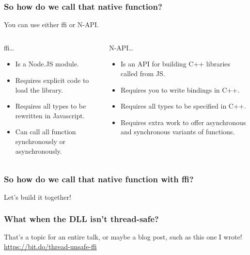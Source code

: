 \begin{frame}
	\frametitle{So how do we call that native function?}

	You can use either ffi or N-API. \vspace{1em}

	\begin{columns}[t]
		\begin{column}{0.5\textwidth}
			ffi…
			\begin{itemize}
				\item Is a Node.JS module.
				\item Requires explicit code to load the library.
				\item Requires all types to be rewritten in Javascript.
				\item Can call all function synchronously or asynchronously.
			\end{itemize}
		\end{column}
		\begin{column}{0.5\textwidth}
			N-API…
			\begin{itemize}
				\item Is an API for building C++ libraries called from JS.
				\item Requires you to write bindings in C++.
				\item Requires all types to be specified in C++.
				\item Requires extra work to offer asynchronous and synchronous
					variants of functions.
			\end{itemize}
		\end{column}
	\end{columns}
\end{frame}

\begin{frame}
	\frametitle{So how do we call that native function with ffi?}

	\centering
	\LARGE
	Let’s build it together!
\end{frame}

\begin{frame}
	\frametitle{What when the DLL isn’t thread-safe?}

	\Large
	That’s a topic for an entire talk, or maybe a blog post, such as this one I wrote! \url{https://bit.do/thread-unsafe-ffi}
\end{frame}

